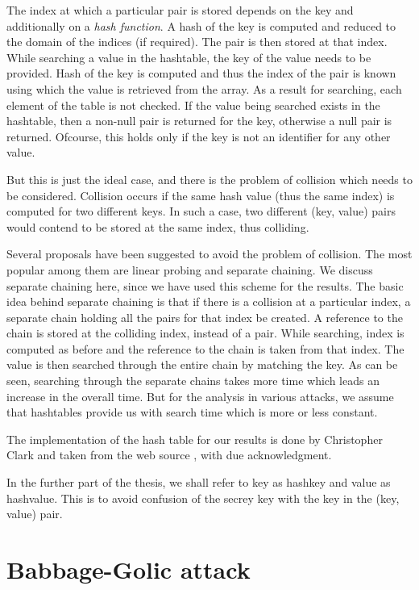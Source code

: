 The index at which a particular pair is stored depends on the key and additionally on a \textit{hash function}. A hash of the key is computed and reduced to the domain of the indices (if required). The pair is then stored at that index. While searching a value in the hashtable, the key of the value needs to be provided. Hash of the key is computed and thus the index of the pair is known using which the value is retrieved from the array. As a result for searching, each element of the table is not checked. If the value being searched exists in the hashtable, then a non-null pair is returned for the key, otherwise a null pair is returned. Ofcourse, this holds only if the key is not an identifier for any other value.

But this is just the ideal case, and there is the problem of collision which needs to be considered. Collision occurs if the same hash value (thus the same index) is computed for two different keys. In such a case, two different (key, value) pairs would contend to be stored at the same index, thus colliding. 

Several proposals have been suggested to avoid the problem of collision. The most popular among them are linear probing and separate chaining. We discuss separate chaining here, since we have used this scheme for the results. The basic idea behind separate chaining is that if there is a collision at a particular index, a separate chain holding all the pairs for that index be created. A reference to the chain is stored at the colliding index, instead of a pair. While searching, index is computed as before and the reference to the chain is taken from that index. The value is then searched through the entire chain by matching the key. As can be seen, searching through the separate chains takes more time which leads an increase in the overall time. But for the analysis in various attacks, we assume that hashtables provide us with search time which is more or less constant. 

The implementation of the hash table for our results is done by Christopher Clark and taken from the web source \cite{hash-table-impl}, with due acknowledgment. 

In the further part of the thesis, we shall refer to key as hashkey and value as hashvalue. This is to avoid confusion of the secrey key with the key in the (key, value) pair. 

\section{Babbage-Golic attack}
\label{sec:bg-keystream-attack}

